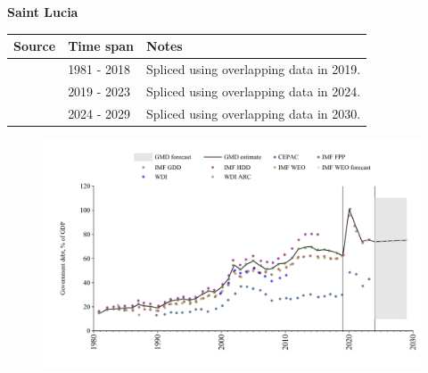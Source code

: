 \documentclass[12pt,a4paper,landscape]{article}
\begin{document}
\begin{adjustbox}{max totalsize={\paperwidth}{\paperheight},center}
\begin{minipage}[t][\textheight][t]{\textwidth}
\vspace*{0.5cm}
{}
\begin{center}
{\Large\bfseries Saint Lucia}
\end{center}
\vspace{0.5cm}
\begin{table}[H]
\centering
\small
\begin{tabular}{|l|l|l|}
\hline
\textbf{Source} & \textbf{Time span} & \textbf{Notes} \\
\hline
\rowcolor{white}\cite{IMF_GDD}& 1981 - 2018 &Spliced using overlapping data in 2019.\\
\rowcolor{lightgray}\cite{IMF_FPP}& 2019 - 2023 &Spliced using overlapping data in 2024.\\
\rowcolor{white}\cite{IMF_WEO_forecast}& 2024 - 2029 &Spliced using overlapping data in 2030.\\
\hline
\end{tabular}
\end{table}
\begin{figure}[H]
\centering
\includegraphics[width=\textwidth,height=0.6\textheight,keepaspectratio]{graphs/LCA_govdebt_GDP.pdf}
\end{figure}
\end{minipage}
\end{adjustbox}
\end{document}
